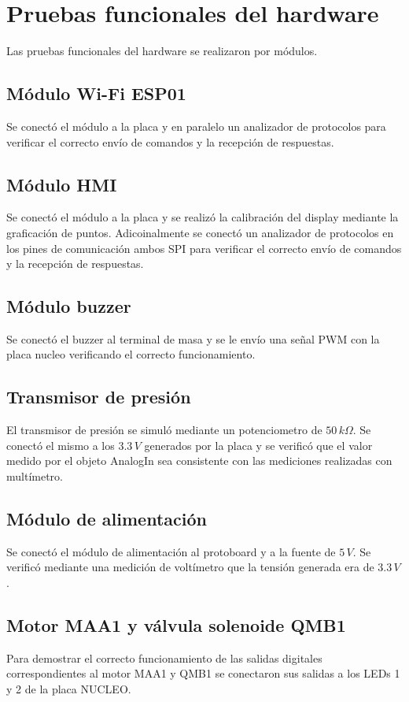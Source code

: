 \section{Pruebas funcionales del hardware}
Las pruebas funcionales del hardware se realizaron por módulos.

\subsection{Módulo Wi-Fi ESP01}
Se conectó el módulo a la placa y en paralelo un analizador de protocolos para verificar el correcto envío de comandos y la recepción de respuestas.

\subsection{Módulo HMI}
Se conectó el módulo a la placa y se realizó la calibración del display mediante la graficación de puntos.
Adicoinalmente se conectó un analizador de protocolos en los pines de comunicación ambos SPI para verificar el correcto envío de comandos y la recepción de respuestas.

\subsection{Módulo buzzer}
Se conectó el buzzer al terminal de masa y se le envío una señal PWM con la placa nucleo verificando el correcto funcionamiento.

\subsection{Transmisor de presión}
El transmisor de presión se simuló mediante un potenciometro de \(50\,k\Omega\). Se conectó el mismo a los \(3.3\,V\) generados por la placa y se verificó que el valor medido por el objeto AnalogIn sea consistente con las mediciones realizadas con multímetro.

\subsection{Módulo de alimentación}
Se conectó el módulo de alimentación al protoboard y a la fuente de \(5\,V\). Se verificó mediante una medición de voltímetro que la tensión generada era de \(3.3\,V\).

\subsection{Motor MAA1 y válvula solenoide QMB1}
Para demostrar el correcto funcionamiento de las salidas digitales correspondientes al motor MAA1 y QMB1 se conectaron sus salidas a los LEDs 1 y 2 de la placa NUCLEO.


